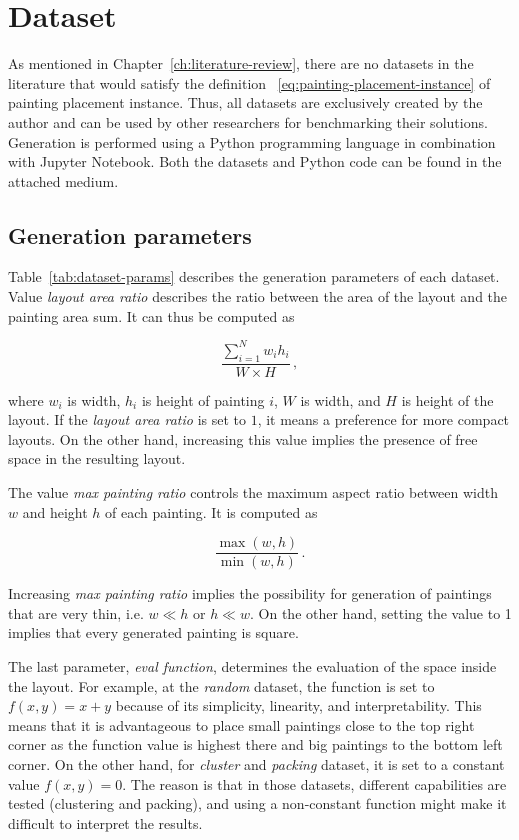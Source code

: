 \section{Dataset}\label{sec:dataset}

As mentioned in Chapter~\ref{ch:literature-review}, there are no datasets in the
literature that would satisfy the definition ~\ref{eq:painting-placement-instance} of painting placement instance.
Thus, all datasets are exclusively created by the author and can be used by other researchers
for benchmarking their solutions.
Generation is performed using a Python programming language in combination with Jupyter Notebook.
Both the datasets and Python code can be found in the attached medium.

\subsection{Generation parameters}\label{subsec:generation-parameters}

Table~\ref{tab:dataset-params} describes the generation parameters of each dataset. Value \textit{layout area ratio}
describes the ratio between the area of the layout and the painting area sum. It can thus be computed as

\[
    \dfrac{\sum\limits_{i=1}^{N} w_i h_i}{W \times H}\,,
\]

where $w_i$ is width, $h_i$ is height of painting $i$, $W$ is width, and $H$ is height of the layout.
If the \textit{layout area ratio} is set to $1$, it means a preference for more compact layouts. On the other hand,
increasing this value implies the presence of free space in the resulting layout.

The value \textit{max painting ratio} controls the maximum aspect ratio between width $w$ and height $h$ of each painting.
It is computed as

\[
    \dfrac{\max(w,h)}{\min(w,h)}\,.
\]

Increasing \textit{max painting ratio} implies the possibility for generation of paintings
that are very thin, i.e. $w \ll h$ or $h \ll w$. On the other hand, setting the value to 1
implies that every generated painting is square.

The last parameter, \textit{eval function}, determines the evaluation of the space inside the layout.
For example, at the \textit{random} dataset, the function is set to $f(x,y) = x+y$ because of its simplicity, linearity, and interpretability.
This means that it is advantageous to place small paintings close to the top right corner as the function value is highest there and
big paintings to the bottom left corner. On the other hand, for \textit{cluster} and \textit{packing}
dataset, it is set to a constant value $f(x,y) = 0$. The reason is that in those datasets, different
capabilities are tested (clustering and packing), and using a non-constant function might make
it difficult to interpret the results.

